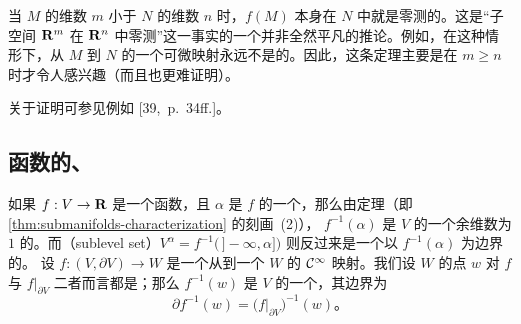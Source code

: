 \begin{remark}\label{thm:m-less-n-measure-zero}
当 $M$ 的维数 $m$ 小于 $N$ 的维数 $n$ 时，$f(M)$ 本身在 $N$ 中就是零测的。这是“子空间 $\mathbf{R}^{m}$ 在 $\mathbf{R}^{n}$ 中零测”这一事实的一个并非全然平凡的推论。例如，在这种情形下，从 $M$ 到 $N$ 的一个可微映射永远不是\trSurjective{}的。因此，这条定理主要是在 $m\ge n$ 时才令人感兴趣（而且也更难证明）。
\end{remark}

关于证明可参见例如 [39,~p.~34ff.]。

\subsection{函数的\trRegular\trLevelSet、\trSublevelSet}
\label{subsec:regular-level-sets-sublevel-sets}

如果 $f:V\to\mathbf{R}$ 是一个函数，且 $\alpha$ 是 $f$ 的一个\trRegularValue，那么由\trRegularValue{}定理（即\cref{thm:submanifolds-characterization} 的刻画~(2)），\trLevelSet{} $f^{-1}(\alpha)$ 是 $V$ 的一个余维数为 $1$ 的\trSubmanifold。而\textbf{\trSublevelSet}（sublevel set）$V^{\alpha}=f^{-1}\bigl(\,]-\infty,\alpha]\bigr)$ 则反过来是一个以 $f^{-1}(\alpha)$ 为边界的\trManifoldWithBoundary。
设 $f:(V,\partial V)\to W$ 是一个从\trManifoldWithBoundary{}到一个\trManifold{} $W$ 的 $\mathcal{C}^{\infty}$ 映射。我们设 $W$ 的点 $w$ 对 $f$ 与 $f|_{\partial V}$ 二者而言都是\trRegularValue；那么 $f^{-1}(w)$ 是 $V$ 的一个\trSubmanifold，其边界为
\[
\partial f^{-1}(w)=\bigl(f|_{\partial V}\bigr)^{-1}(w)\text{。}
\]
